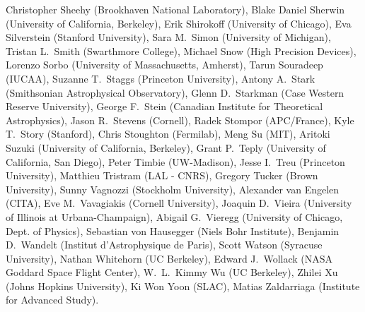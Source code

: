Christopher Sheehy (Brookhaven National Laboratory),
Blake Daniel Sherwin (University of California, Berkeley),
Erik Shirokoff (University of Chicago),
Eva Silverstein (Stanford University),
Sara M.~Simon (University of Michigan),
Tristan L.~Smith (Swarthmore College),
Michael Snow (High Precision Devices),
Lorenzo Sorbo (University of Massachusetts, Amherst),
Tarun Souradeep (IUCAA),
Suzanne T.~Staggs (Princeton University),
Antony A.~Stark (Smithsonian Astrophysical Observatory),
Glenn D.~Starkman (Case Western Reserve University),
George F.~Stein (Canadian Institute for Theoretical Astrophysics),
Jason R.~Stevens (Cornell),
Radek Stompor (APC/France),
Kyle T.~Story (Stanford),
Chris Stoughton (Fermilab),
Meng Su (MIT),
Aritoki Suzuki (University of California, Berkeley),
Grant P.~Teply (University of California, San Diego),
Peter Timbie (UW-Madison),
Jesse I.~Treu (Princeton University),
Matthieu Tristram (LAL - CNRS),
Gregory Tucker (Brown University),
Sunny Vagnozzi (Stockholm University),
Alexander van Engelen (CITA),
Eve M.~Vavagiakis (Cornell University),
Joaquin D.~Vieira (University of Illinois at Urbana-Champaign),
Abigail G.~Vieregg (University of Chicago, Dept. of Physics),
Sebastian von Hausegger (Niels Bohr Institute),
Benjamin D.~Wandelt (Institut d'Astrophysique de Paris),
Scott Watson (Syracuse University),
Nathan Whitehorn (UC Berkeley),
Edward J.~Wollack (NASA Goddard Space Flight Center),
W.~L.~Kimmy Wu (UC Berkeley),
Zhilei Xu (Johns Hopkins University),
Ki Won Yoon (SLAC),
Matias Zaldarriaga (Institute for Advanced Study).
